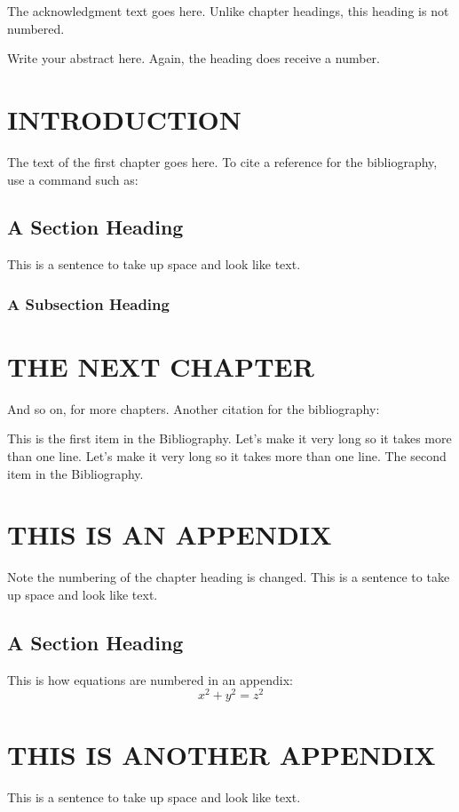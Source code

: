 \documentclass{thesis}
\author{Sir Isaac Newton}
\begin{document}
\titlepage             %
\tableofcontents       %
\listoftables          %
\listoffigures         %

The acknowledgment text goes here. Unlike chapter headings,
this heading is not numbered.

Write your abstract here. Again, the heading does receive a number.

\chapter{INTRODUCTION}
The text of the first chapter goes here. To cite a reference for the
bibliography, use a command such as:\cite{thisbook}
\section{A Section Heading}
This is a sentence to take up space and look like text.
\subsection{A Subsection Heading}

\chapter{THE NEXT CHAPTER}
And so on, for more chapters.
Another citation for the bibliography:\cite{anotherbook}

\begin{singlespace}
\begin{thebibliography}{99}
 This is the first item in the Bibliography.
Let's make it very long so it takes more than one line.
Let's make it very long so it takes more than one line.
 The second item in the Bibliography.
\end{thebibliography}
\end{singlespace}

\appendix    %
\chapter{THIS IS AN APPENDIX}
Note the numbering of the chapter heading is changed.
This is a sentence to take up space and look like text.
\section{A Section Heading}
This is how equations are numbered in an appendix:
\begin{equation}
x^2 + y^2 = z^2
\end{equation}

\chapter{THIS IS ANOTHER APPENDIX}
This is a sentence to take up space and look like text.
\end{document}
